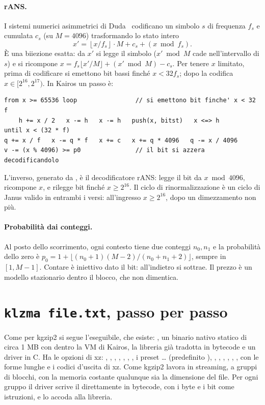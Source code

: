 \paragraph{rANS.} I sistemi numerici asimmetrici di Duda~\cite{ans} codificano un simbolo $s$ di frequenza $f_s$ e cumulata $c_s$ (su $M = 4096$) trasformando lo stato intero
\[ x' = \left\lfloor x / f_s \right\rfloor \cdot M + c_s + (x \bmod f_s). \]
È una biiezione esatta: da $x'$ si legge il simbolo ($x' \bmod M$ cade nell'intervallo di $s$) e si ricompone $x = f_s \lfloor x'/M \rfloor + (x' \bmod M) - c_s$. Per tenere $x$ limitato, prima di codificare si emettono bit bassi finché $x < 32 f_s$; dopo la codifica $x \in [2^{16}, 2^{17})$. In Kairos un passo è:
\begin{lstlisting}
from x >= 65536 loop                // si emettono bit finche' x < 32 f
    h += x / 2   x -= h   x -= h   push(x, bitst)   x <=> h
until x < (32 * f)
q += x / f   x -= q * f   x += c   x += q * 4096   q -= x / 4096
v -= (x % 4096) >= p0               // il bit si azzera decodificandolo
\end{lstlisting}
L'inverso, generato da , è il decodificatore rANS: legge il bit da $x \bmod 4096$, ricompone $x$, e rilegge bit finché $x \ge 2^{16}$. Il ciclo di rinormalizzazione è un ciclo di Janus valido in entrambi i versi: all'ingresso $x \ge 2^{16}$, dopo un dimezzamento non più.

\paragraph{Probabilità dai conteggi.} Al posto dello scorrimento, ogni contesto tiene due conteggi $n_0, n_1$ e la probabilità dello zero è $p_0 = 1 + \lfloor (n_0+1)(M-2) / (n_0+n_1+2) \rfloor$, sempre in $[1, M-1]$. Contare è iniettivo dato il bit: all'indietro si sottrae. Il prezzo è un modello stazionario dentro il blocco, che non dimentica.

\section{\texttt{klzma file.txt}, passo per passo}
\label{sec:pipeline}

Come per kgzip2 si segue l'eseguibile, che esiste: , un binario nativo statico di circa 1 MB con dentro la VM di Kairos, la libreria  già tradotta in bytecode e un driver in C. Ha le opzioni di xz: , , , , , , , i preset \dots{} (predefinito ), , , , , , , con le forme lunghe e i codici d'uscita di xz. Come kgzip2 lavora in streaming, a gruppi di blocchi, con la memoria costante qualunque sia la dimensione del file. Per ogni gruppo il driver scrive il  direttamente in bytecode, con i byte e i bit come istruzioni, e lo accoda alla libreria.

